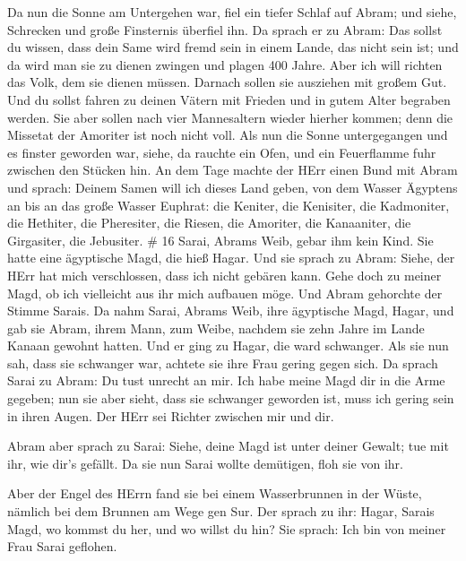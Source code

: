  Da nun die Sonne am Untergehen war, fiel ein tiefer Schlaf
auf Abram; und siehe, Schrecken und große Finsternis überfiel ihn.
 Da sprach er zu Abram: Das sollst du wissen, dass dein
Same wird fremd sein in einem Lande, das nicht sein ist; und da wird man
sie zu dienen zwingen und plagen 400 Jahre.  Aber ich will
richten das Volk, dem sie dienen müssen. Darnach sollen sie ausziehen
mit großem Gut.  Und du sollst fahren zu deinen Vätern mit
Frieden und in gutem Alter begraben werden.  Sie aber
sollen nach vier Mannesaltern wieder hierher kommen; denn die Missetat
der Amoriter ist noch nicht voll.  Als nun die Sonne
untergegangen und es finster geworden war, siehe, da rauchte ein Ofen,
und ein Feuerflamme fuhr zwischen den Stücken hin.  An dem
Tage machte der HErr einen Bund mit Abram und sprach: Deinem Samen will
ich dieses Land geben, von dem Wasser Ägyptens an bis an das große
Wasser Euphrat:  die Keniter, die Kenisiter, die
Kadmoniter,  die Hethiter, die Pheresiter, die Riesen,
 die Amoriter, die Kanaaniter, die Girgasiter, die
Jebusiter. \# 16  Sarai, Abrams Weib, gebar ihm kein Kind.
Sie hatte eine ägyptische Magd, die hieß Hagar.  Und sie
sprach zu Abram: Siehe, der HErr hat mich verschlossen, dass ich nicht
gebären kann. Gehe doch zu meiner Magd, ob ich vielleicht aus ihr mich
aufbauen möge. Und Abram gehorchte der Stimme Sarais.  Da
nahm Sarai, Abrams Weib, ihre ägyptische Magd, Hagar, und gab sie Abram,
ihrem Mann, zum Weibe, nachdem sie zehn Jahre im Lande Kanaan gewohnt
hatten.  Und er ging zu Hagar, die ward schwanger. Als sie
nun sah, dass sie schwanger war, achtete sie ihre Frau gering gegen
sich.  Da sprach Sarai zu Abram: Du tust unrecht an mir. Ich
habe meine Magd dir in die Arme gegeben; nun sie aber sieht, dass sie
schwanger geworden ist, muss ich gering sein in ihren Augen. Der HErr
sei Richter zwischen mir und dir.

 Abram aber sprach zu Sarai: Siehe, deine Magd ist unter
deiner Gewalt; tue mit ihr, wie dir's gefällt. Da sie nun Sarai wollte
demütigen, floh sie von ihr.

 Aber der Engel des HErrn fand sie bei einem Wasserbrunnen
in der Wüste, nämlich bei dem Brunnen am Wege gen Sur.  Der
sprach zu ihr: Hagar, Sarais Magd, wo kommst du her, und wo willst du
hin? Sie sprach: Ich bin von meiner Frau Sarai geflohen.

